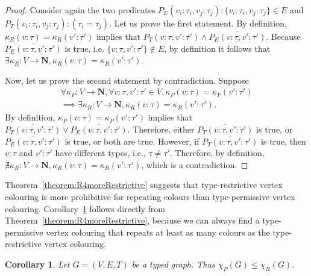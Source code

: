 \documentclass[preprint,12pt]{elsarticle}
\theoremstyle{plain}
\newtheorem{corollary}[theorem]{Corollary}
\newcommand\tyv[2]{#1\!\!:\!\!#2}
\begin{document}
\begin{proof}
Consider again the two predicates
$P_E(\tyv{v_i}{\tau_i}, \tyv{v_j}{\tau_j}): \{\tyv{v_i}{\tau_i}, \tyv{v_j}{\tau_j}\}\in E$
and
$P_T(\tyv{v_i}{\tau_i}, \tyv{v_j}{\tau_j}):(\tau_i=\tau_j)$.
Let us prove the first statement.
By definition,
$\kappa_R(\tyv{v}{\tau})=\kappa_R(\tyv{v'}{\tau'})$ implies
that $P_T(\tyv{v}{\tau},\tyv{v'}{\tau'}) \wedge \overline{P_E(\tyv{v}{\tau},\tyv{v'}{\tau'})}$.
Because $\overline{P_E(\tyv{v}{\tau},\tyv{v'}{\tau'})}$ is true,
i.e. $\{\tyv{v}{\tau},\tyv{v'}{\tau'}\}\notin E$,
by definition it follows that $\exists \kappa_R:V\rightarrow \mathbf{N}, \kappa_R(\tyv{v}{\tau})=\kappa_R(\tyv{v'}{\tau'})$.

Now, let us prove the second statement by contradiction.
Suppose
\begin{equation*}
\begin{split}
\forall \kappa_P:V\rightarrow \mathbf{N}, \forall \tyv{v}{\tau},\tyv{v'}{\tau'}\in V,
\kappa_P(\tyv{v}{\tau})=\kappa_P(\tyv{v'}{\tau'}) \\
\implies \exists \kappa_R:V\rightarrow \mathbf{N}, \kappa_R(\tyv{v}{\tau})=\kappa_R(\tyv{v'}{\tau'}).
\end{split}
\end{equation*}
By definition,
$\kappa_P(\tyv{v}{\tau})=\kappa_P(\tyv{v'}{\tau'})$ implies
that $\overline{P_T(\tyv{v}{\tau},\tyv{v'}{\tau'})} \vee \overline{P_E(\tyv{v}{\tau},\tyv{v'}{\tau'})}$.
Therefore, either $\overline{P_T(\tyv{v}{\tau},\tyv{v'}{\tau'})}$ is true, 
or $\overline{P_E(\tyv{v}{\tau},\tyv{v'}{\tau'})}$ is true, or both are true.
However, if $\overline{P_T(\tyv{v}{\tau},\tyv{v'}{\tau'})}$ is true,
then $\tyv{v}{\tau}$ and $\tyv{v'}{\tau'}$ have different types, i.e., 
$\tau\neq\tau'$.
Therefore, by definition, $\nexists \kappa_R:V\rightarrow \mathbf{N}, \kappa_R(\tyv{v}{\tau})=\kappa_R(\tyv{v'}{\tau'})$,
which is a contradiction.
\end{proof}

Theorem~\ref{theorem:R4moreRestrictive} suggests that
type-restrictive vertex colouring is more prohibitive 
for repeating colours than type-permissive vertex colouring.
Corollary~\ref{cor:colouringrelation} follows directly from Theorem~\ref{theorem:R4moreRestrictive},
because we can always find a 
type-permissive vertex colouring that repeats at least as many colours as
the type-restrictive vertex colouring.

\begin{corollary}\label{cor:colouringrelation}
Let $G = (V,E,T)$ be a typed graph.
Thus $\chi_P(G) \leq \chi_R(G)$.
\end{corollary}
\end{document}
